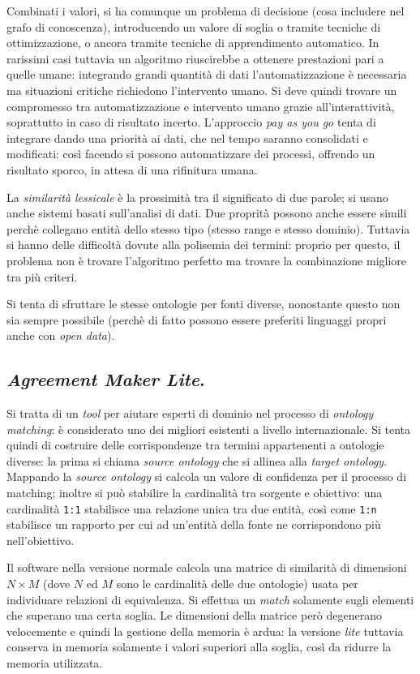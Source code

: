 \documentclass[11pt]{article}
\begin{document}
Combinati i valori, si ha comunque un problema di decisione (cosa includere nel grafo di conoscenza), introducendo un valore di soglia o tramite tecniche di ottimizzazione, o ancora tramite tecniche di apprendimento automatico.
In rarissimi casi tuttavia un algoritmo riuscirebbe a ottenere prestazioni pari a quelle umane: integrando grandi quantità di dati l'automatizzazione è necessaria ma situazioni critiche richiedono l'intervento umano.
Si deve quindi trovare un compromesso tra automatizzazione e intervento umano grazie all'interattività, soprattutto in caso di risultato incerto.
L'approccio \textit{pay as you go} tenta di integrare dando una priorità ai dati, che nel tempo saranno consolidati e modificati: così facendo si possono automatizzare dei processi, offrendo un risultato sporco, in attesa di una rifinitura umana.

La \textit{similarità lessicale} è la prossimità tra il significato di due parole; si usano anche sistemi basati sull'analisi di dati.
Due proprità possono anche essere simili perchè collegano entità dello stesso tipo (stesso range e stesso dominio).
Tuttavia si hanno delle difficoltà dovute alla polisemia dei termini: proprio per questo, il problema non è trovare l'algoritmo perfetto ma trovare la combinazione migliore tra più criteri.

Si tenta di sfruttare le stesse ontologie per fonti diverse, nonostante questo non sia sempre possibile (perchè di fatto possono essere preferiti linguaggi propri anche con \textit{open data}).

\subsection{\textit{Agreement Maker Lite}.}
Si tratta di un \textit{tool} per aiutare esperti di dominio nel processo di \textit{ontology matching}: è considerato uno dei migliori esistenti a livello internazionale.
Si tenta quindi di costruire delle corrispondenze tra termini appartenenti a ontologie diverse: la prima si chiama \textit{source ontology} che si allinea alla \textit{target ontology}.
Mappando la \textit{source ontology} si calcola un valore di confidenza per il processo di matching; inoltre si può stabilire la cardinalità tra sorgente e obiettivo: una cardinalità \verb|1:1| stabilisce una relazione unica tra due entità, così come \verb|1:n| stabilisce un rapporto per cui ad un'entità della fonte ne corrispondono più nell'obiettivo.

Il software nella versione normale calcola una matrice di similarità di dimensioni $N \times M$ (dove $N$ ed $M$ sono le cardinalità delle due ontologie) usata per individuare relazioni di equivalenza.
Si effettua un \textit{match} solamente sugli elementi che superano una certa soglia.
Le dimensioni della matrice però degenerano velocemente e quindi la gestione della memoria è ardua: la versione \textit{lite} tuttavia conserva in memoria solamente i valori superiori alla soglia, così da ridurre la memoria utilizzata.
\end{document}
